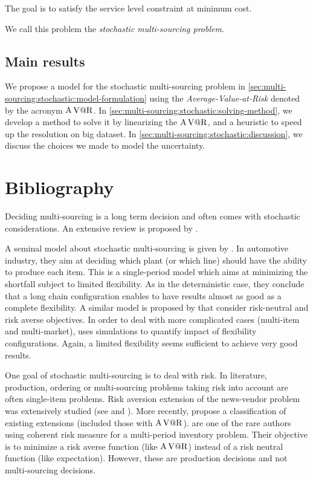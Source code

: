 The goal is to satisfy the service level constraint at minimum cost.


We call this problem the \emph{stochastic multi-sourcing problem}.


\subsection{Main results}
\label{sec:multi-sourcing:stochastic:introduction:main-results}


We propose a model for the stochastic multi-sourcing problem in \cref{sec:multi-sourcing:stochastic:model-formulation} using the \emph{Average-Value-at-Risk} denoted by the acronym $\operatorname{A\operatorname{V@R}}$.
In \cref{sec:multi-sourcing:stochastic:solving-method}, we develop a method to solve it by linearizing the $\operatorname{A\operatorname{V@R}}$, and a heuristic to speed up the resolution on big dataset.
In \cref{sec:multi-sourcing:stochastic:discussion}, we discuss the choices we made to model the uncertainty.


\section{Bibliography}
\label{sec:multi-sourcing:stochastic:bibliography}


Deciding multi-sourcing is a long term decision and often comes with stochastic considerations.
An extensive review is proposed by \citet{Yao2017}.


A seminal model about stochastic multi-sourcing is given by \citet{Jordan1995}.
In automotive industry, they aim at deciding which plant (or which line) should have the ability to produce each item.
This is a single-period model which aims at minimizing the shortfall subject to limited flexibility.
As in the deterministic case, they conclude that a long chain configuration enables to have results almost as good as a complete flexibility.
A similar model is proposed by \citet{Brian2005} that consider risk-neutral and risk averse objectives.
In order to deal with more complicated cases (multi-item and multi-market), \citet{Garavelli2003} uses simulations to quantify impact of flexibility configurations.
Again, a limited flexibility seems sufficient to achieve very good results.


One goal of stochastic multi-sourcing is to deal with risk.
In literature, production, ordering or multi-sourcing problems taking risk into account are often single-item problems.
Risk aversion extension of the news-vendor problem was extensively studied (see \citet{Vipul2000} and \citet{Choi2008}).
More recently, \citet{Arikan2017} propose a classification of existing extensions (included those with $\operatorname{A\operatorname{V@R}}$).
\citet{Ahmed2007} are one of the rare authors using coherent risk measure for a multi-period inventory problem.
Their objective is to minimize a risk averse function (like $\operatorname{A\operatorname{V@R}}$) instead of a risk neutral function (like expectation).
However, these are production decisions and not multi-sourcing decisions.


